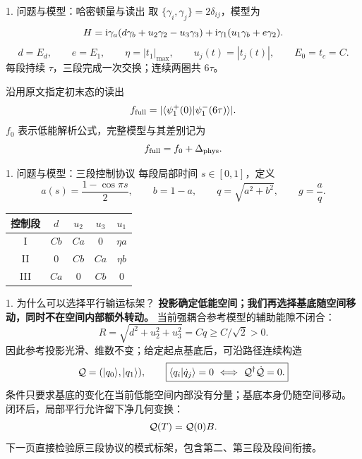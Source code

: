 \documentclass[aspectratio=169,11pt]{beamer}
\begin{document}
\begin{frame}[t]{1. 问题与模型：哈密顿量与读出}
  取 $\{\gamma_i,\gamma_j\}=2\delta_{ij}$，模型为
  \[
    H=\mathrm{i}\gamma_a(d\gamma_b+u_2\gamma_2-u_3\gamma_3)
      +\mathrm{i}\gamma_1(u_1\gamma_b+e\gamma_2).
  \]
  \[
    d=E_d,\qquad e=E_1,\qquad \eta=|t_1|_{\max},\qquad
    u_j(t)=|t_j(t)|,\qquad E_0=t_c=C.
  \]
  每段持续 $\tau$，三段完成一次交换；连续两圈共 $6\tau$。
  \vspace{.2cm}
  \begin{block}{沿用原文指定初末态的读出}
    \[
      f_{\rm full}=|\langle\psi_1^+(0)|\psi_1^-(6\tau)\rangle|.
    \]
    $f_0$ 表示低能解析公式，完整模型与其差别记为
    \[
      f_{\rm full}=f_0+\Delta_{\rm phys}.
    \]
  \end{block}
\end{frame}

\begin{frame}[t]{1. 问题与模型：三段控制协议}
  每段局部时间 $s\in[0,1]$，定义
  \[
    a(s)=\frac{1-\cos\pi s}{2},\qquad b=1-a,\qquad
    q=\sqrt{a^2+b^2},\qquad g=\frac aq.
  \]
  \begin{center}
    \renewcommand{\arraystretch}{1.5}
    \begin{tabular}{ccccc}
      \toprule 控制段 & $d$ & $u_2$ & $u_3$ & $u_1$\\\midrule
      I & $Cb$ & $Ca$ & $0$ & $\eta a$\\
      II & $0$ & $Cb$ & $Ca$ & $\eta b$\\
      III & $Ca$ & $0$ & $Cb$ & $0$\\\bottomrule
    \end{tabular}
  \end{center}
  \vspace{.25cm}
\end{frame}

\begin{frame}[t]{1. 为什么可以选择平行输运标架？}
  \small
  \setlength{\abovedisplayskip}{4pt}\setlength{\belowdisplayskip}{4pt}
  \textbf{投影确定低能空间；我们再选择基底随空间移动，同时不在空间内部额外转动。}
  当前强耦合参考模型的辅助能隙不闭合：
  \[
    R=\sqrt{d^2+u_2^2+u_3^2}=Cq\ge C/\sqrt2>0.
  \]
  因此参考投影光滑、维数不变；给定起点基底后，可沿路径连续构造
  \[
    \Q=(\ket{q_0},\ket{q_1}),\qquad
    \boxed{\langle q_i|\dot q_j\rangle=0\ \Longleftrightarrow\ \Q^\dagger\dot\Q=0.}
  \]
  条件只要求基底的变化在当前低能空间内部没有分量；基底本身仍随空间移动。
  闭环后，局部平行允许留下净几何变换：
  \[
    \mathcal Q(T)=\mathcal Q(0)B.
  \]
  下一页直接检验原三段协议的模式标架，包含第二、第三段及段间衔接。
  \vspace{.15cm}
\end{frame}
\end{document}
